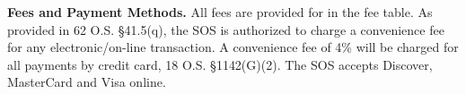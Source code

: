 \textbf{Fees and Payment Methods.}
All fees are provided for in the fee table. As provided in 62 O.S. §41.5(q), the
SOS is authorized to charge a convenience fee for any electronic/on-line
transaction. A convenience fee of 4\% will be charged for all payments by credit
card, 18 O.S. §1142(G)(2). The SOS accepts Discover, MasterCard and Visa online.